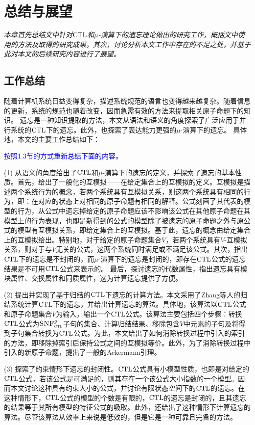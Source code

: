 \chapter{总结与展望}\label{chapter09}
{\em 本章首先总结文中针对$\textrm{CTL}$和$\mu$-演算下的遗忘理论做出的研究工作，概括文中使用的方法及取得的研究成果。其次，讨论分析本文工作中存在的不足之处，并基于此对本文的后续研究内容进行了展望。}

\section{工作总结}
随着计算机系统日益变得复杂，描述系统规范的语言也变得越来越复杂。随着信息的更新，系统的规范也随着改变，因而急需有效的方法来提取相关原子命题下的知识。
遗忘是一种知识提取的方法，本文从语法和语义的角度探索了广泛应用于并行系统的$\textrm{CTL}$下的遗忘。此外，也探索了表达能力更强的$\mu$-演算下的遗忘。
具体地，本文的主要工作总结如下：

\textcolor{blue}{按照1.3节的方式重新总结下面的内容。}

(1) 从语义的角度给出了$\textrm{CTL}$和$\mu$-演算下的遗忘的定义，并探索了遗忘的基本性质。首先，给出了一般化的互模拟——在给定集合上的互模拟的定义。互模拟是描述两个系统行为的概念，若两个系统具有互模拟关系，则这两个系统具有相同的行为，即：在对应的状态上对相同的原子命题有相同的解释。公式刻画了其代表的模型的行为，从公式中遗忘掉给定的原子命题应该不影响该公式在其他原子命题在其模型上的行为表现，也即是新得到的公式的模型除了被遗忘的原子命题之外与原公式的模型有互模拟关系，即给定集合上的互模拟。基于此，遗忘的概念由给定集合上的互模拟给出。特别地，对于给定的原子命题集合$V$，若两个系统具有$V$-互模拟关系，则对于与$V$无关的公式，这两个系统同时满足或不满足该公式。其次，指出$\textrm{CTL}$下的遗忘是不封闭的，而$\mu$-演算下的遗忘是封闭的，即存在$\textrm{CTL}$公式的遗忘结果是不可用$\textrm{CTL}$公式来表示的。
最后，探讨遗忘的代数属性，指出遗忘具有模块属性、交换属性和同质属性，这为计算遗忘提供了方便。

(2) 提出并实现了基于归结的$\textrm{CTL}$下遗忘的计算方法。本文采用了Zhang等人的归结系统计算$\textrm{CTL}$下的遗忘，并给出计算遗忘的算法。具体地，该算法以$\textrm{CTL}$公式和原子命题集合$V$为输入，输出一个$\textrm{CTL}$公式。该算法主要包括四个步骤：转换$\textrm{CTL}$公式为${\textsc{SNF}_{\textsc{ctl}}^g}$子句的集合、计算归结结果、移除包含$V$中元素的子句及将得到子句集合转换为$\textrm{CTL}$公式。为此，本文给出了如何消除转换过程中引入的索引的方法，即移除掉索引后保持公式之间的互模拟等价。此外，为了消除转换过程中引入的新原子命题，提出了一般的Ackermann引理。

(3) 探索了约束情形下遗忘的封闭性。$\textrm{CTL}$公式具有小模型性质，也即是对给定的$\textrm{CTL}$公式，若该公式是可满足的，则其存在一个该公式大小指数的一个模型。因而本文讨论这种具有约束大小的公式，并讨论有限状态空间下的$\textrm{CTL}$的遗忘。在这种情形下，$\textrm{CTL}$公式的模型的个数是有限的，$\textrm{CTL}$的遗忘是封闭的，且其遗忘的结果等于其所有模型的特征公式的吸取。此外，还给出了这种情形下计算遗忘的算法。尽管该算法从效率上来说是低效的，但是它是一种可靠且完备的方法。

